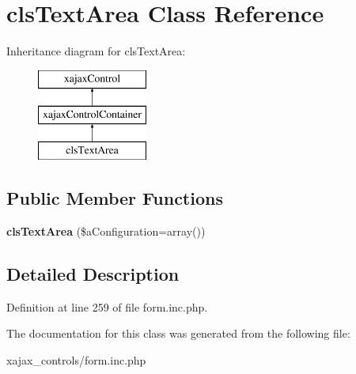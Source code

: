\hypertarget{classclsTextArea}{
\section{clsTextArea Class Reference}
\label{classclsTextArea}
}
Inheritance diagram for clsTextArea:\begin{figure}[H]
\begin{center}
\leavevmode
\includegraphics[height=3.000000cm]{classclsTextArea}
\end{center}
\end{figure}
\subsection*{Public Member Functions}
\begin{DoxyCompactItemize}
\item 
\hypertarget{classclsTextArea_a3a97b164935edf701fea6e01d164ef79}{
{\bfseries clsTextArea} (\$aConfiguration=array())}
\label{classclsTextArea_a3a97b164935edf701fea6e01d164ef79}

\end{DoxyCompactItemize}


\subsection{Detailed Description}


Definition at line 259 of file form.inc.php.



The documentation for this class was generated from the following file:\begin{DoxyCompactItemize}
\item 
xajax\_\-controls/form.inc.php\end{DoxyCompactItemize}
